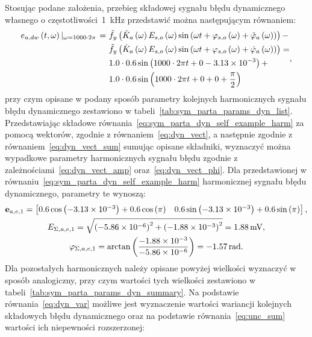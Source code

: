 Stosując podane założenia, przebieg składowej sygnału błędu dynamicznego własnego o częstotliwości~\qty{1}{kHz} przedstawić można następującym równaniem:
\begin{equation}
\begin{split}
e_{a,dw} \left(t,\omega\right) \left|_{\omega = 1000 \cdot 2 \pi } \right. =~
& \tilde{f}_{y} \left(\tilde{K}_{a} \left(\omega\right) E_{s,o} \left(\omega\right) \sin \left( \omega t + \varphi_{s,o} \left(\omega\right) + \tilde{\varphi}_{a} \left(\omega\right) \right)\right) - \\
& \tilde{f}_{y} \left(\dot{K}_{a} \left(\omega\right) E_{s,o} \left(\omega\right) \sin \left( \omega t + \varphi_{s,o} \left(\omega\right) + \dot{\varphi}_{a} \left(\omega\right) \right)\right) = \\
& 1.0 \cdot 0.6 \sin \left( 1000 \cdot 2 \pi t + 0 - \num{3.13e-3} \right) + \\
& 1.0 \cdot 0.6 \sin \left( 1000 \cdot 2 \pi t + 0 + 0 + \frac{\pi}{2} \right)
\end{split}
\label{eq:sym_parta_dyn_self_example_harm},
\end{equation}
przy czym opisane w podany sposób parametry kolejnych harmonicznych sygnału błędu dynamicznego zestawiono w tabeli~\ref{tab:sym_parta_params_dyn_list}. Przedstawiając składowe równania~\eqref{eq:sym_parta_dyn_self_example_harm} za pomocą wektorów, zgodnie z równaniem~\eqref{eq:dyn_vect}, a następnie zgodnie z równaniem~\eqref{eq:dyn_vect_sum} sumując opisane składniki, wyznaczyć można wypadkowe parametry harmonicznych sygnału błędu zgodnie z zależnościami~\eqref{eq:dyn_vect_amp} oraz~\eqref{eq:dyn_vect_phi}. Dla przedstawionej w równaniu~\eqref{eq:sym_parta_dyn_self_example_harm} harmonicznej sygnału błędu dynamicznego, parametry te wynoszą:
\begin{gather}
\mathbf{e}_{a,e,1} =
\begin{bmatrix}
0.6 \cos \left(\num{-3.13e-3}\right) + 0.6 \cos \left(\pi\right) & 0.6 \sin \left(\num{-3.13e-3}\right) + 0.6 \sin \left(\pi\right)
\end{bmatrix}
\label{eq:sym_parta_dyn_self_example_sum}, \\
E_{\Sigma,a,e,1} = \sqrt{\left(\num{-5.86e-6}\right)^{2} + \left(\num{-1.88e-3}\right)^{2}} = \qty{1.88}{mV} \label{eq:sym_parta_dyn_self_example_amp}, \\
\varphi_{\Sigma,a,e,1} = \arctan \left(\frac{\num{-1.88e-3}}{\num{-5.86e-6}}\right) = \qty{-1.57}{rad} \label{eq:sym_parta_dyn_self_example_phi}.
\end{gather}
Dla pozostałych harmonicznych należy opisane powyżej wielkości wyznaczyć w sposób analogiczny, przy czym wartości tych wielkości zestawiono w tabeli~\ref{tab:sym_parta_params_dyn_summary}. Na podstawie równania~\eqref{eq:dyn_var} możliwe jest wyznaczenie wartości wariancji kolejnych składowych błędu dynamicznego oraz na podstawie równania~\eqref{eq:unc_sum} wartości ich niepewności rozszerzonej:
